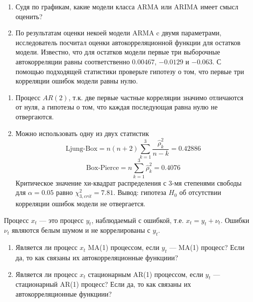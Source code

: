 \begin{problem}
\begin{enumerate}
\item Судя по графикам, какие модели класса ARMA или ARIMA имеет смысл оценить?
\item По результатам оценки некоей модели ARMA c двумя параметрами, исследователь посчитал оценки автокорреляционной функции для остатков модели. 
Известно, что для остатков модели первые три выборочные автокорреляции равны соответственно $0.00467$, $-0.0129$ и $-0.063$. 
С помощью подходящей статистики проверьте гипотезу о том, что первые три корреляции ошибок модели равны нулю.
\end{enumerate}


\begin{sol}
\begin{enumerate}
\item Процесс $AR(2)$, т.к. две первые частные корреляции значимо отличаются от нуля, а гипотезы о том, что каждая последующая равна нулю не отвергаются.
\item Можно использовать одну из двух статистик
\[
\text{Ljung-Box}=n(n+2)\sum_{k=1}^3\frac{\hat{\rho}_k^2}{n-k}=
0.42886
\]
\[
\text{Box-Pierce}=n\sum_{k=1}^3\hat{\rho}_k^2=
0.4076
\]
Критическое значение хи-квадрат распределения с 3-мя степенями свободы для $\alpha=0.05$ равно $\chi^2_{3,crit}=7.81$.
Вывод: гипотеза $H_0$ об отсутствии корреляции ошибок модели не отвергается.
\end{enumerate}
\end{sol}
\end{problem}




\begin{problem}
Процесс $x_t$ — это процесс $y_t$, наблюдаемый с ошибкой, т.е. $x_t=y_t+\nu_t$. 
Ошибки $\nu_t$ являются белым шумом и не коррелированы с $y_t$.
\begin{enumerate}
\item Является ли процесс $x_t$ MA(1) процессом, если $y_t$ —  MA(1) процесс? 
Если да, то как связаны их автокорреляционные функциии?
\item Является ли процесс $x_t$ стационарным AR(1) процессом, если $y_t$ —  стационарный AR(1) процесс? 
Если да, то как связаны их автокорреляционные функциии?
\end{enumerate}


\begin{sol}

\end{sol}
\end{problem}


